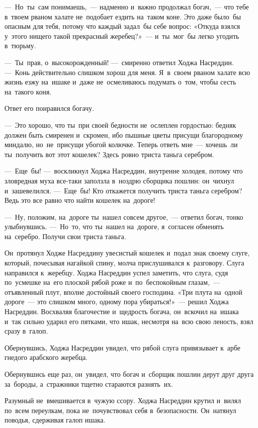 \documentclass[12pt,a4paper]{book}
\begin{document}
—~Но~ты~сам понимаешь,~— надменно и~важно продолжал богач,~— что тебе в~твоем рваном халате не~подобает ездить на~таком коне. Это даже было~бы опасным для тебя, потому что каждый задал~бы себе вопрос: «Откуда взялся у~этого нищего такой прекрасный жеребец?»~— и~ты~мог~бы легко угодить в~тюрьму.

—~Ты~прав, о~высокорожденный! —~смиренно ответил Ходжа Насреддин. —~Конь действительно слишком хорош для меня. Я~в~своем рваном халате всю жизнь езжу на~ишаке и~даже не~осмеливаюсь подумать о~том, чтобы сесть на~такого коня.

Ответ его понравился богачу.

—~Это хорошо, что ты~при своей бедности не~ослеплен гордостью: бедняк должен быть смиренен и~скромен, ибо пышные цветы присущи благородному миндалю, но~не~присущи убогой колючке. Теперь ответь мне~— хочешь~ли ты~получить вот этот кошелек? Здесь ровно триста таньга серебром.

—~Еще~бы! —~воскликнул Ходжа Насреддин, внутренне холодея, потому что зловредная муха все-таки заползла в~ноздрю сборщика пошлин: он~чихнул и~зашевелился. —~Еще~бы! Кто откажется получить триста таньга серебром? Ведь это все равно что найти кошелек на~дороге!

—~Ну, положим, на~дороге ты~нашел совсем другое,~— ответил богач, тонко улыбнувшись. —~Но~то, что ты~нашел на~дороге, я~согласен обменять на~серебро. Получи свои триста таньга.

Он~протянул Ходже Насреддину увесистый кошелек и~подал знак своему слуге, который, почесывая нагайкой спину, молча прислушивался к~разговору. Слуга направился к~жеребцу. Ходжа Насреддин успел заметить, что слуга, судя по~усмешке на~его плоской рябой роже и~по~беспокойным глазам,~— отъявленный плут, вполне достойный своего господина. «Три плута на~одной дороге~— это слишком много, одному пора убираться!»~— решил Ходжа Насреддин. Восхваляя благочестие и~щедрость богача, он~вскочил на~ишака и~так сильно ударил его пятками, что ишак, несмотря на~всю свою леность, взял сразу в~галоп.

Обернувшись, Ходжа Насреддин увидел, что рябой слуга привязывает к~арбе гнедого арабского жеребца.

Обернувшись еще раз, он~увидел, что богач и~сборщик пошлин дерут друг друга за~бороды, а~стражники тщетно стараются разнять~их.

Разумный не~вмешивается в~чужую ссору. Ходжа Насреддин крутил и~вилял по~всем переулкам, пока не~почувствовал себя в~безопасности. Он~натянул поводья, сдерживая галоп ишака.
\end{document}
